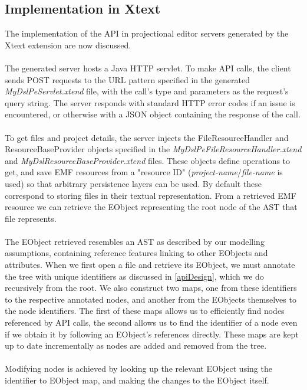 \documentclass{article}
\begin{document}
{\subsection{Implementation in Xtext}
The implementation of the API in projectional editor servers generated by the Xtext extension are now discussed.
\\
\\
The generated server hosts a Java HTTP servlet. To make API calls, the client sends POST requests to the URL pattern specified in the generated \emph{MyDslPeServlet.xtend} file, with the call's type and parameters as the request's query string. The server responds with standard HTTP error codes if an issue is encountered, or otherwise with a JSON object containing the response of the call.
\\
\\
To get files and project details, the server injects the FileResourceHandler and ResourceBaseProvider objects specified in the \emph{MyDslPeFileResourceHandler.xtend} and \emph{MyDslResourceBaseProvider.xtend} files. These objects define operations to get, and save EMF resources from a "resource ID" (\emph{project-name}/\emph{file-name} is used) so that arbitrary persistence layers can be used. By default these correspond to storing files in their textual representation. From a retrieved EMF resource we can retrieve the EObject representing the root node of the AST that file represents.
\\
\\
The EObject retrieved resembles an AST as described by our modelling assumptions, containing reference features linking to other EObjects and attributes. When we first open a file and retrieve its EObject, we must annotate the tree with unique identifiers as discussed in \ref{apiDesign}, which we do recursively from the root. We also construct two maps, one from these identifiers to the respective annotated nodes, and another from the EObjects themselves to the node identifiers. The first of these maps allows us to efficiently find nodes referenced by API calls, the second allows us to find the identifier of a node even if we obtain it by following an EObject's references directly. These maps are kept up to date incrementally as nodes are added and removed from the tree.
\\
\\
Modifying nodes is achieved by looking up the relevant EObject using the identifier to EObject map, and making the changes to the EObject itself.
\\
}
\end{document}
